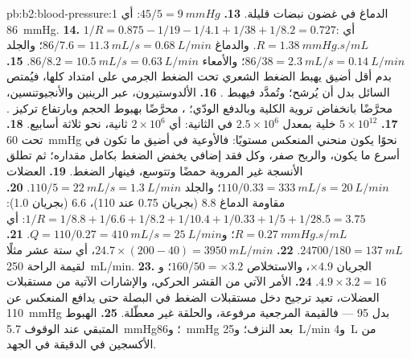 \begin{solution}{pb:b2:blood-pressure:1}
الدماغ في غضون نبضات قليلة.
\textbf{13.} $45/5 = \qty{9}{mmHg}$: أي \qty{86}{mmHg}.
\textbf{14.} $1/R = 0.875 - 1/19 - 1/4.1 + 1/38 + 1/8.2 = 0.727$: أي $R =
\qty{1.38}{mmHg.s/mL}$. والدماغ $86/7.6 = \qty{11.3}{mL/s} =
\qty{0.68}{L/min}$؛ والجلد $86/38 = \qty{2.3}{mL/s} = \qty{0.14}{L/min}$؛
والأمعاء $86/8.2 = \qty{10.5}{mL/s} = \qty{0.63}{L/min}$.
\textbf{15.} بدم أقل  أضيق يهبط الضغط الشعري
تحت الضغط الجرمي على امتداد  كلها،
فيُمتص السائل بدل أن يُرشح؛ وتُمدَّد 
فيهبط .
\textbf{16.} الألدوستيرون، عبر الرينين والأنجيوتنسين، محرَّضًا بانخفاض
تروية الكلية وبالدفع الودّي؛ ،
محرَّضًا بهبوط الحجم وبارتفاع تركيز
.
\textbf{17.} $5\times 10^{12}$ خلية بمعدل $2.5\times 10^{6}$ في الثانية:
أي $2\times 10^{6}$ ثانية، نحو ثلاثة أسابيع.
\textbf{18.} تحت \qty{60}{mmHg} نحوًا يكون منحني المنعكس مستويًا:
فالأوعية في أضيق ما تكون  في أسرع ما يكون، والربح
صفر، وكل فقد إضافي يخفض الضغط بكامل
مقداره؛ ثم تطلق الأنسجة غير المروية حمضًا وتتوسع،
فينهار الضغط.
\textbf{19.} العضلات $110/0.33 = \qty{333}{mL/s} = \qty{20}{L/min}$؛
والجلد $110/5 = \qty{22}{mL/s} = \qty{1.3}{L/min}$.
\textbf{20.} مقاومة الدماغ $8.8$ (بجريان 0.75 عند 110)،  $6.6$
(بجريان 1.0): $1/R = 1/8.8 + 1/6.6 + 1/8.2 + 1/10.4 + 1/0.33 + 1/5 +
1/28.5 = 3.75$: أي $R = \qty{0.27}{mmHg.s/mL}$؛ و$Q = 110/0.27 =
\qty{410}{mL/s} = \qty{25}{L/min}$.
\textbf{21.} $\num{24700}/180 = \qty{137}{mL}$.
\textbf{22.} $24.7\times(200 - 40) = \qty{3950}{mL/min}$، أي ستة عشر مثلًا
لقيمة الراحة \qty{250}{mL/min}.
\textbf{23.} الجريان $\times 4.9$، والاستخلاص $160/50 = \times 3.2$؛
و$4.9\times 3.2 = 16$.
\textbf{24.} الأمر الآتي من القشر الحركي، والإشارات الآتية من
مستقبلات العضلات، تعيد ترجيح دخل مستقبلات الضغط في
البصلة حتى يدافع المنعكس عن \qty{110}{mmHg} بدل 95 ---
فالقيمة المرجعية مرفوعة، والحلقة غير معطّلة.
\textbf{25.} الهبوط المتبقي عند الوقوف \qty{5.7}{mmHg}؛ و\qty{86}{mmHg}
بعد النزف؛ و\qty{25}{L/min} و\qty{4}{L} من الأكسجين في
الدقيقة في الجهد.
\end{solution}
